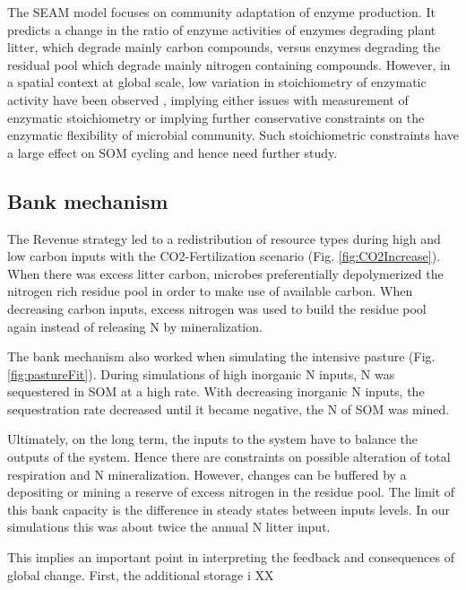 The SEAM model focuses on community adaptation of enzyme production. It predicts
a change in the ratio of enzyme activities of enzymes degrading plant litter,
which degrade mainly carbon compounds, versus enzymes degrading the residual
pool which degrade mainly nitrogen containing compounds.
However, in a spatial context at global scale, low variation in stoichiometry of
enzymatic activity have been observed \citep{Sinsabaugh09}, implying either
issues with measurement of enzymatic stoichiometry or implying further
conservative constraints on the enzymatic flexibility of microbial community.
Such stoichiometric constraints have a large effect on SOM cycling and hence
need further study.

\subsection{Bank mechanism}
The Revenue strategy led to a redistribution of resource types during high
and low carbon inputs with the  CO2-Fertilization scenario (Fig.
\ref{fig:CO2Increase}). When there was excess litter carbon, microbes
preferentially depolymerized the nitrogen rich residue pool in order to make use of available
carbon. When decreasing carbon inputs, excess nitrogen was used to
build the residue pool again instead of releasing N by mineralization.

The bank mechanism also worked when simulating the intensive
pasture (Fig. \ref{fig:pastureFit}). During simulations of high inorganic
N inputs, N was sequestered in SOM at a high rate. With decreasing inorganic N
inputs, the sequestration rate decreased until it became negative, the N of SOM
was mined.
 
Ultimately, on the long term, the inputs to the system have to balance the
outputs of the system. Hence there are constraints on possible alteration of
total respiration and N mineralization. However, changes can be buffered by a 
depositing or mining a reserve of excess nitrogen in the residue pool.
The limit of this bank capacity is the difference in steady states between
inputs levels. In our simulations this was about twice the annual N
litter input. 

This implies an important point in interpreting the feedback and consequences
of global change.  First, the additional storage i XX

